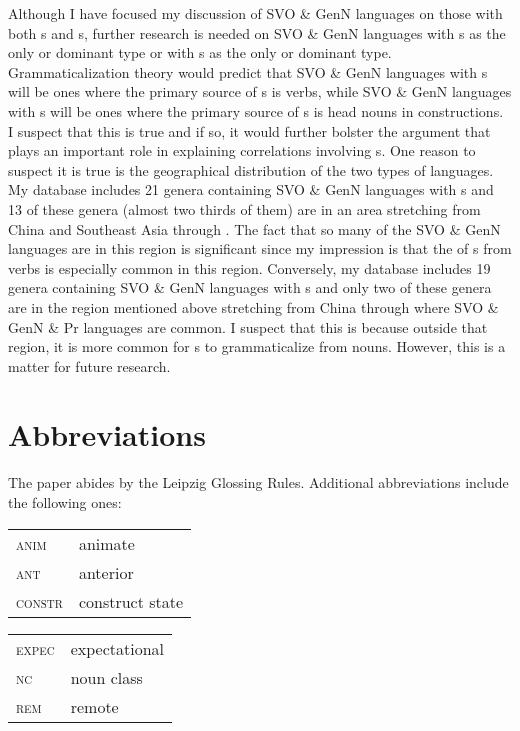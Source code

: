 \documentclass[output=paper]{langsci/langscibook}
\begin{document}
Although I have focused my discussion of SVO \& GenN languages on those with both s and s, further research is needed on SVO \& GenN languages with s as the only or dominant type or with s as the only or dominant type. Grammaticalization theory would predict that SVO \& GenN languages with s will be ones where the primary source of s is verbs, while SVO \& GenN languages with s will be ones where the primary source of s is head nouns in  constructions. I suspect that this is true and if so, it would further bolster the argument that  plays an important role in explaining correlations involving s. One reason to suspect it is true is the geographical distribution of the two types of languages. My database includes 21 genera containing SVO \& GenN languages with s and 13 of these genera (almost two thirds of them) are in an area stretching from China and Southeast Asia through . The fact that so many of the SVO \& GenN languages are in this region is significant since my impression is that the  of s from verbs is especially common in this region. Conversely, my database includes 19 genera containing SVO \& GenN languages with s and only two of these genera are in the region mentioned above stretching from China through  where SVO \& GenN \& Pr languages are common. I suspect that this is because outside that region, it is more common for s to grammaticalize from nouns. However, this is a matter for future research.

\section*{Abbreviations}

The paper abides by the Leipzig Glossing Rules. Additional abbreviations include the following ones:\\


\begin{tabularx}{.45\textwidth}{lQ}
\textsc{anim}  &{animate} \\
\textsc{ant}  &{anterior}\\
\textsc{constr} & construct state\\
\end{tabularx}
\begin{tabularx}{.45\textwidth}{lQ}
\textsc{expec} & expectational\\
\textsc{nc} & noun class\\
\textsc{rem}  &remote\\
\end{tabularx}
\end{document}
